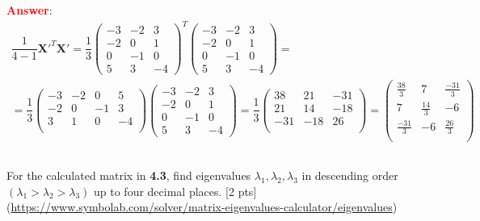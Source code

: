 \documentclass{homework}
\begin{document}
    \textbf{\textcolor{red}{Answer}}: \\
    \begin{equation*}
        \begin{gathered}
                \dfrac{1}{4-1}\textbf{X}'^T\textbf{X}' = \dfrac{1}{3}\left( \begin{matrix} -3 & -2 & 3 \\ -2 & 0 & 1 \\ 0 & -1 & 0 \\ 5 & 3 & -4 \end{matrix} \right)^{T}\left( \begin{matrix} -3 & -2 & 3 \\ -2 & 0 & 1 \\ 0 & -1 & 0 \\ 5 & 3 & -4 \end{matrix} \right) = \\
                = \dfrac{1}{3}\left( \begin{matrix} -3 & -2 & 0 & 5 \\ -2 & 0 & -1 & 3 \\ 3 & 1 & 0 & -4 \\ \end{matrix} \right)\left( \begin{matrix} -3 & -2 & 3 \\ -2 & 0 & 1 \\ 0 & -1 & 0 \\ 5 & 3 & -4 \end{matrix} \right) = \dfrac{1}{3}\left(\begin{matrix}
                38 & 21 & -31 \\
                21 & 14 & -18 \\
                -31 & -18 & 26 \\
                \end{matrix}\right) = \left(\begin{matrix}
                \frac{38}{3} & 7 & \frac{-31}{3} \\
                7 & \frac{14}{3} & -6 \\
                \frac{-31}{3} & -6 & \frac{26}{3} \\
                \end{matrix}\right)
        \end{gathered}
    \end{equation*}
    
    \subsection{}
    For the calculated matrix in \textbf{4.3}, find eigenvalues $\lambda_{1},\lambda_{2},\lambda_{3}$ in descending order  $(\lambda_{1} > \lambda_{2} > \lambda_{3})$ up to four decimal places. [2 pts] \\
    (\href{<https://www.symbolab.com/solver/matrix-eigenvalues-calculator/eigenvalues>}{https://www.symbolab.com/solver/matrix-eigenvalues-calculator/eigenvalues})
    
\end{document}
